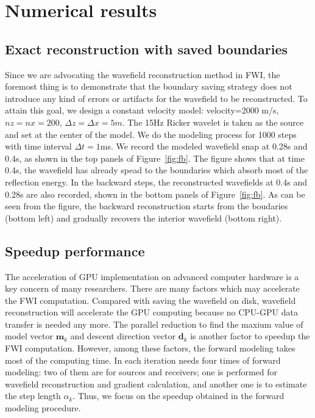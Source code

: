 
\section{Numerical results}

\subsection{Exact reconstruction with saved boundaries}


Since we are advocating the wavefield reconstruction method in FWI, the foremost thing is to demonstrate that the boundary saving strategy does not introduce any kind of errors or artifacts for the wavefield to be reconstructed. To attain this goal, we design a constant velocity model: velocity=2000 m/s, $nz=nx=200$, $\Delta z=\Delta x=5m$. The 15Hz Ricker wavelet is taken as the source and set at the center of the model. We do the modeling process for 1000 steps with time interval $\Delta t=1$ms. We record the modeled wavefield snap at 0.28s and 0.4s, as shown in the top panels of Figure~\ref{fig:fb}. The figure shows that at time 0.4s, the wavefield has already spead to the boundaries which absorb most of the reflection energy. In the backward steps, the reconstructed wavefields at 0.4s and 0.28s are also recorded, shown in the bottom panels of Figure~\ref{fig:fb}. As can be seen from the figure, the backward reconstruction starts from the boudaries (bottom left) and gradually recovers the interior wavefield (bottom right). 



\subsection{Speedup performance}

The acceleration of GPU implementation on advanced computer hardware is a key concern of many researchers. There are many factors which may accelerate the FWI computation. Compared with saving the wavefield on disk, wavefield reconstruction will accelerate the GPU computing because no CPU-GPU data transfer is needed any more. The parallel reduction to find the maxium value of model vector $\textbf{m}_k$ and descent direction vector $\textbf{d}_k$ is another factor to speedup the FWI computation. However, among these factors, the forward modeling takes most of the computing time. In each iteration needs four times of forward modeling: two of them are for sources and receivers; one is performed for wavefield reconstruction and gradient calculation, and another one is to estimate the step length $\alpha_k$. Thus, we focus on the speedup obtained in the forward modeling procedure.

